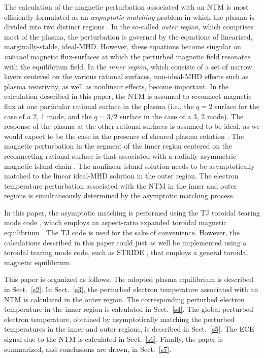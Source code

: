 \documentclass{iopjournal}
\begin{document}
The calculation of the  magnetic perturbation associated with an NTM is most efficiently formulated as an {\em asymptotic matching}\/ problem in which the  plasma is  divided into two distinct regions \cite{tear1,tear2,tear3,tear4,tear5,tear6,tear7,tear8,tear9,tear10}.    In the so-called {\em outer region}, which comprises most
of the plasma, the perturbation is governed by the equations of linearized, marginally-stable, ideal-MHD.
However, these equations become singular on   {\em rational}\/ magnetic flux-surfaces at which the perturbed magnetic field resonates with the equilibrium field. In the {\em inner region}, which
consists of a set of narrow layers centered on the various rational surfaces, non-ideal-MHD effects such as plasma resistivity, as well as nonlinear effects,  become important. 
 In the calculation described in this paper, the NTM is assumed to reconnect magnetic flux at one particular rational surface in the plasma (i.e., the
 $q=2$ surface for the case of a 2, 1 mode, and the $q=3/2$ surface in the case of a 3, 2 mode). The response of the plasma at the
 other rational surfaces is assumed to be ideal, as we would expect to be the case in the presence of sheared plasma rotation \cite{tear5}.
The magnetic perturbation in the segment of the inner region centered on the reconnecting rational surface is that associated with a radially asymmetric magnetic island chain \cite{ntm1,island}.
The nonlinear island solution needs to be asymptotically matched to the linear ideal-MHD solution in the outer region. The
electron temperature perturbation associated with the NTM in the inner and outer regions is simultaneously  determined by the asymptotic matching process. 

In this paper, the asymptotic matching is performed using the TJ toroidal tearing mode code \cite{tear9,tear10},  which employs an aspect-ratio
expanded toroidal magnetic equilibrium \cite{exp}. The TJ code is used for the sake of convenience. However, the calculations described in this paper
could just as well be implemented using a toroidal tearing mode code, such as STRIDE \cite{tear7,tear8}, that employs a general toroidal magnetic 
equilibrium. 

This paper is organized as follows. The adopted plasma equilibrium is described in Sect.~\ref{s2}.  In Sect.~\ref{s3}, the perturbed electron temperature associated with  an NTM is calculated in the outer region. The corresponding perturbed electron temperature  in the inner region is calculated in Sect.~\ref{s4}. The
global perturbed electron temperature, obtained by asymptotically matching the perturbed temperatures  in  the inner and outer regions, is
described in Sect.~\ref{s5}. 
The ECE signal due to the NTM is calculated in Sect.~\ref{s6}.
 Finally, the paper is summarized, and conclusions are drawn, in Sect.~\ref{s7}. 
\end{document}
